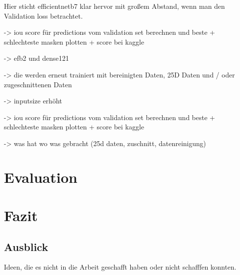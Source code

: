 Hier sticht efficientnetb7 klar hervor mit großem Abstand, wenn man den Validation loss betrachtet. 

\begin{table}[H]
\caption{\label{tab:efb256}Baseline Performances nach Validation loss absteigend sortiert.}
\end{table}

-> iou score für predictions vom validation set berechnen und beste + schlechteste masken plotten + score bei kaggle 

-> efb2 und dense121 

-> die werden erneut trainiert mit bereinigten Daten, 25D Daten und / oder zugeschnittenen Daten

-> inputsize erhöht

-> iou score für predictions vom validation set berechnen und beste + schlechteste masken plotten + score bei kaggle 

-> was hat wo was gebracht (25d daten, zuschnitt, datenreinigung) 

\section{Evaluation}\raggedbottom

\section{Fazit}\raggedbottom

\subsection{Ausblick}
Ideen, die es nicht in die Arbeit geschafft haben oder nicht schafffen konnten.


\pagebreak

